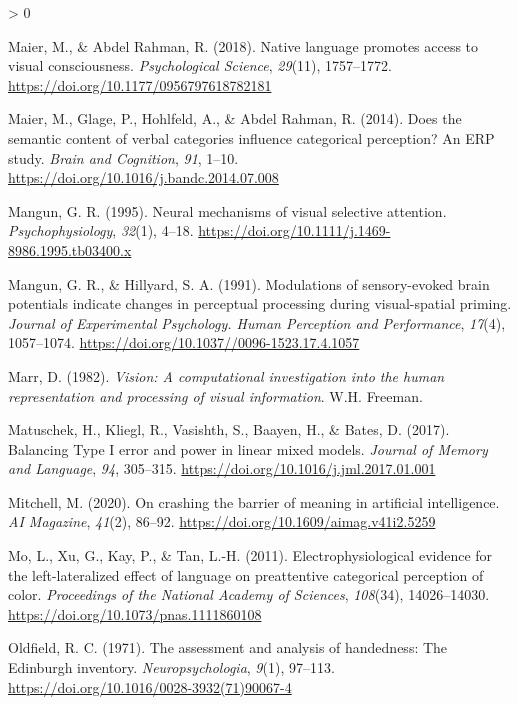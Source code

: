 \documentclass[
  english,
  doc,12pt,twoside,floatsintext]{apa7}
\newlength{\cslhangindent}
\newenvironment{CSLReferences}[2] %
 {%
  \setlength{\parindent}{0pt}
  \ifodd #1 \everypar{\setlength{\hangindent}{\cslhangindent}}\ignorespaces\fi
  \ifnum #2 > 0
  \setlength{\parskip}{#2\baselineskip}
  \fi
 }%
 {}
\begin{document}
\begin{CSLReferences}{1}{0}
\leavevmode\hypertarget{ref-maier2018}{}%
Maier, M., \& Abdel Rahman, R. (2018). Native language promotes access to visual consciousness. \emph{Psychological Science}, \emph{29}(11), 1757--1772. \url{https://doi.org/10.1177/0956797618782181}

\leavevmode\hypertarget{ref-maier2014}{}%
Maier, M., Glage, P., Hohlfeld, A., \& Abdel Rahman, R. (2014). Does the semantic content of verbal categories influence categorical perception? An {ERP} study. \emph{Brain and Cognition}, \emph{91}, 1--10. \url{https://doi.org/10.1016/j.bandc.2014.07.008}

\leavevmode\hypertarget{ref-mangun1995}{}%
Mangun, G. R. (1995). Neural mechanisms of visual selective attention. \emph{Psychophysiology}, \emph{32}(1), 4--18. \url{https://doi.org/10.1111/j.1469-8986.1995.tb03400.x}

\leavevmode\hypertarget{ref-mangun1991}{}%
Mangun, G. R., \& Hillyard, S. A. (1991). Modulations of sensory-evoked brain potentials indicate changes in perceptual processing during visual-spatial priming. \emph{Journal of Experimental Psychology. Human Perception and Performance}, \emph{17}(4), 1057--1074. \url{https://doi.org/10.1037//0096-1523.17.4.1057}

\leavevmode\hypertarget{ref-marr1982}{}%
Marr, D. (1982). \emph{Vision: A computational investigation into the human representation and processing of visual information}. W.H. Freeman.

\leavevmode\hypertarget{ref-matuschek2017}{}%
Matuschek, H., Kliegl, R., Vasishth, S., Baayen, H., \& Bates, D. (2017). Balancing {Type I} error and power in linear mixed models. \emph{Journal of Memory and Language}, \emph{94}, 305--315. \url{https://doi.org/10.1016/j.jml.2017.01.001}

\leavevmode\hypertarget{ref-mitchell2020}{}%
Mitchell, M. (2020). On crashing the barrier of meaning in artificial intelligence. \emph{AI Magazine}, \emph{41}(2), 86--92. \url{https://doi.org/10.1609/aimag.v41i2.5259}

\leavevmode\hypertarget{ref-mo2011}{}%
Mo, L., Xu, G., Kay, P., \& Tan, L.-H. (2011). Electrophysiological evidence for the left-lateralized effect of language on preattentive categorical perception of color. \emph{Proceedings of the National Academy of Sciences}, \emph{108}(34), 14026--14030. \url{https://doi.org/10.1073/pnas.1111860108}

\leavevmode\hypertarget{ref-oldfield1971}{}%
Oldfield, R. C. (1971). The assessment and analysis of handedness: The {Edinburgh} inventory. \emph{Neuropsychologia}, \emph{9}(1), 97--113. \url{https://doi.org/10.1016/0028-3932(71)90067-4}


\end{CSLReferences}
\end{document}
